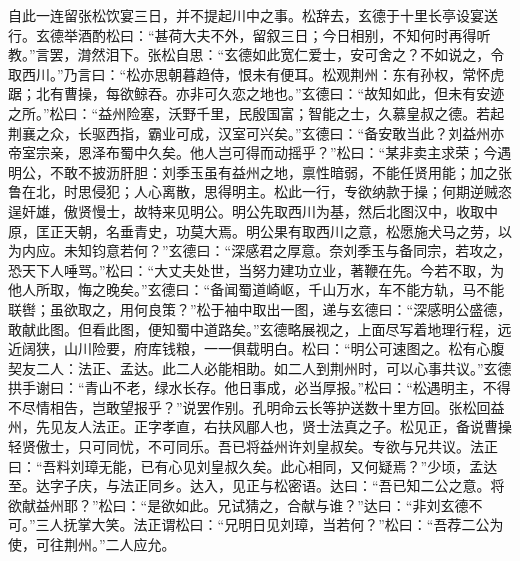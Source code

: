 自此一连留张松饮宴三日，并不提起川中之事。松辞去，玄德于十里长亭设宴送行。玄德举酒酌松曰：“甚荷大夫不外，留叙三日；今日相别，不知何时再得听教。”言罢，潸然泪下。张松自思：“玄德如此宽仁爱士，安可舍之？不如说之，令取西川。”乃言曰：“松亦思朝暮趋侍，恨未有便耳。松观荆州：东有孙权，常怀虎踞；北有曹操，每欲鲸吞。亦非可久恋之地也。”玄德曰：“故知如此，但未有安迹之所。”松曰：“益州险塞，沃野千里，民殷国富；智能之士，久慕皇叔之德。若起荆襄之众，长驱西指，霸业可成，汉室可兴矣。”玄德曰：“备安敢当此？刘益州亦帝室宗亲，恩泽布蜀中久矣。他人岂可得而动摇乎？”松曰：“某非卖主求荣；今遇明公，不敢不披沥肝胆：刘季玉虽有益州之地，禀性暗弱，不能任贤用能；加之张鲁在北，时思侵犯；人心离散，思得明主。松此一行，专欲纳款于操；何期逆贼恣逞奸雄，傲贤慢士，故特来见明公。明公先取西川为基，然后北图汉中，收取中原，匡正天朝，名垂青史，功莫大焉。明公果有取西川之意，松愿施犬马之劳，以为内应。未知钧意若何？”玄德曰：“深感君之厚意。奈刘季玉与备同宗，若攻之，恐天下人唾骂。”松曰：“大丈夫处世，当努力建功立业，著鞭在先。今若不取，为他人所取，悔之晚矣。”玄德曰：“备闻蜀道崎岖，千山万水，车不能方轨，马不能联辔；虽欲取之，用何良策？”松于袖中取出一图，递与玄德曰：“深感明公盛德，敢献此图。但看此图，便知蜀中道路矣。”玄德略展视之，上面尽写着地理行程，远近阔狭，山川险要，府库钱粮，一一俱载明白。松曰：“明公可速图之。松有心腹契友二人：法正、孟达。此二人必能相助。如二人到荆州时，可以心事共议。”玄德拱手谢曰：“青山不老，绿水长存。他日事成，必当厚报。”松曰：“松遇明主，不得不尽情相告，岂敢望报乎？”说罢作别。孔明命云长等护送数十里方回。张松回益州，先见友人法正。正字孝直，右扶风郿人也，贤士法真之子。松见正，备说曹操轻贤傲士，只可同忧，不可同乐。吾已将益州许刘皇叔矣。专欲与兄共议。法正曰：“吾料刘璋无能，已有心见刘皇叔久矣。此心相同，又何疑焉？”少顷，孟达至。达字子庆，与法正同乡。达入，见正与松密语。达曰：“吾已知二公之意。将欲献益州耶？”松曰：“是欲如此。兄试猜之，合献与谁？”达曰：“非刘玄德不可。”三人抚掌大笑。法正谓松曰：“兄明日见刘璋，当若何？”松曰：“吾荐二公为使，可往荆州。”二人应允。

